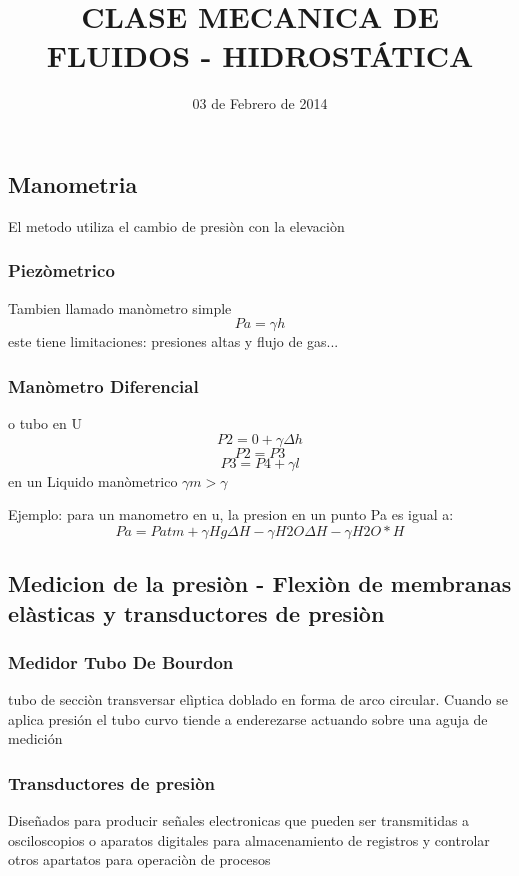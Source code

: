 \documentclass{article}
\title{CLASE MECANICA DE FLUIDOS - HIDROSTÁTICA}
\begin{document}
\date{03 de Febrero de 2014}
\maketitle 
\subsection{Manometria}

El metodo utiliza el cambio de presiòn con la elevaciòn
\subsubsection{Piezòmetrico}
Tambien llamado manòmetro simple
\begin{equation}
 Pa = {\gamma}h
\end{equation}
este tiene limitaciones: presiones altas y flujo de gas...
\subsubsection{Manòmetro Diferencial}
o tubo en U 
\begin{equation}
 P2 = 0 +{\gamma}{\varDelta}h
\end{equation}
\begin{equation}
 P2 = P3
\end{equation}
\begin{equation}
 P3 = P4 + {\gamma}l
\end{equation}
en un Liquido manòmetrico $ {\gamma}m > \gamma  $

Ejemplo: 
para un manometro en u, la presion en un punto Pa es igual a: 
\begin{equation}
 Pa = Patm + {\gamma}Hg{\varDelta}H - {\gamma}H2O{\varDelta}H - {\gamma}H2O * H  
\end{equation}

\subsection{Medicion de la presiòn - Flexiòn de membranas elàsticas y transductores de presiòn}
\subsubsection{Medidor Tubo De Bourdon }
tubo de secciòn transversar elìptica doblado en forma de arco circular. Cuando se aplica presión el tubo curvo tiende a enderezarse actuando sobre una aguja de medición
\subsubsection{Transductores de presiòn}
Diseñados para producir señales electronicas que pueden ser transmitidas a osciloscopios o aparatos digitales para almacenamiento de registros y  controlar otros apartatos para operaciòn de procesos
\end{document}
